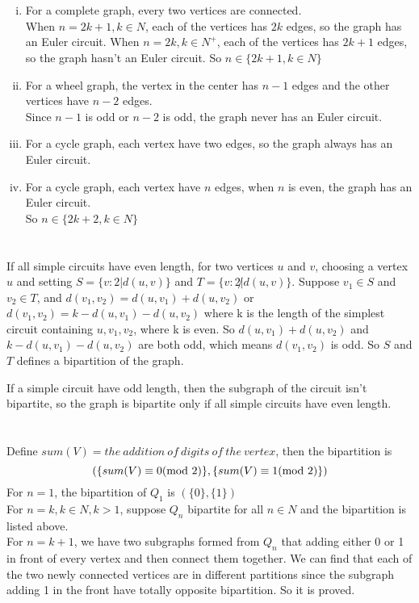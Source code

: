\documentclass{article}
\begin{document}
\section{}
\begin{enumerate}[i)]
\item
For a complete graph, every two vertices are connected.\\
When $n=2k+1,k\in N$, each of the vertices has $2k$ edges, so the graph has an Euler circuit.
When $n=2k,k\in N^+$, each of the vertices has $2k+1$ edges, so the graph hasn't an Euler circuit.
So $n\in\lbrace 2k+1,k\in N\rbrace$
\item
For a wheel graph, the vertex in the center has $n-1$ edges and the other vertices have $n-2$ edges.\\
Since $n-1$ is odd or $n-2$ is odd, the graph never has an Euler circuit.
\item
For a cycle graph, each vertex have two edges, so the graph always has an Euler circuit.
\item
For a cycle graph, each vertex have $n$ edges, when $n$ is even, the graph has an Euler circuit.\\
So $n\in\lbrace 2k+2,k\in N\rbrace$
\end{enumerate}

\section{}
If all simple circuits have even length, for two vertices $u$ and $v$, choosing a vertex $u$ and setting $S=\lbrace v:2|d(u,v)\rbrace$ and $T=\lbrace v:2\not|d(u,v)\rbrace$. Suppose $v_1\in S$ and $v_2\in T$, and $d(v_1,v_2)=d(u,v_1)+d(u,v_2)$ or $d(v_1,v_2)=k-d(u,v_1)-d(u,v_2)$ where k is the length of the simplest circuit containing $u,v_1,v_2$, where k is even. So $d(u,v_1)+d(u,v_2)$ and $k-d(u,v_1)-d(u,v_2)$ are both odd, which means $d(v_1,v_2)$ is odd. So $S$ and $T$ defines a bipartition of the graph.

If a simple circuit have odd length, then the subgraph of the circuit isn't bipartite, so the graph is bipartite only if all simple circuits have even length.

\section{}
Define $sum(V)=the\ addition\ of\ digits\ of\ the\ vertex$, then the bipartition is
$$(\lbrace sum(V)\equiv 0 {\rm(mod\ 2)} \rbrace,\lbrace sum(V)\equiv 1 {\rm(mod\ 2)} \rbrace)$$
For $n=1$, the bipartition of $Q_1$ is $(\lbrace0\rbrace,\lbrace1\rbrace)$\\
For $n=k,k\in N,k>1$, suppose $Q_n$ bipartite for all $n\in N$ and the bipartition is listed above.\\
For $n=k+1$, we have two subgraphs formed from $Q_n$ that adding either 0 or 1 in front of every vertex and then connect them together. We can find that each of the two newly connected vertices are in different partitions since the subgraph adding 1 in the front have totally opposite bipartition. So it is proved.
\end{document}
